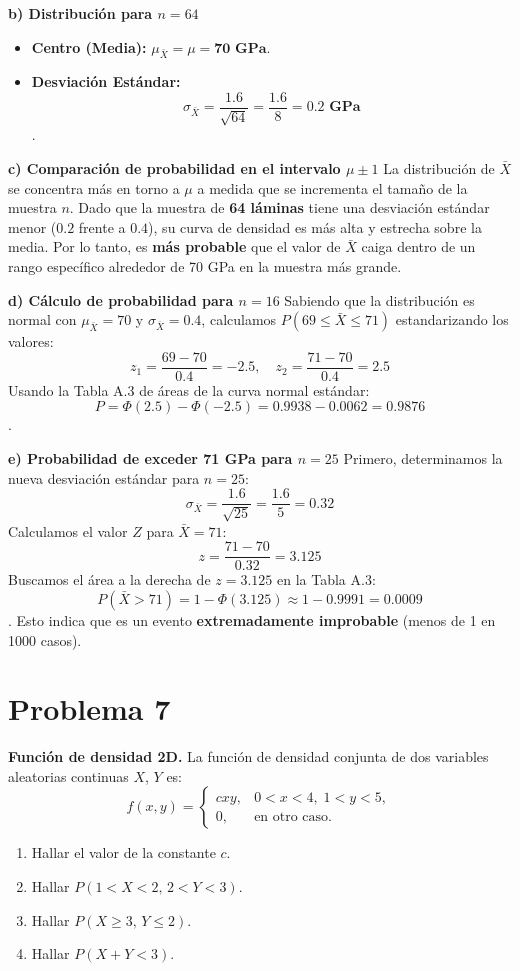 \documentclass[a4paper]{article}
\begin{document}
\textbf{b) Distribución para $n = 64$}
\begin{itemize}
    \item \textbf{Centro (Media):} $\mu_{\bar{X}} = \mu = \mathbf{70 \text{ GPa}}$.
    \item \textbf{Desviación Estándar:}
    $$\sigma_{\bar{X}} = \frac{1.6}{\sqrt{64}} = \frac{1.6}{8} = \mathbf{0.2 \text{ GPa}}$$.
\end{itemize}

\textbf{c) Comparación de probabilidad en el intervalo $\mu \pm 1$}
La distribución de $\bar{X}$ se concentra más en torno a $\mu$ a medida que se incrementa el tamaño de la muestra $n$. Dado que la muestra de \textbf{64 láminas} tiene una desviación estándar menor ($0.2$ frente a $0.4$), su curva de densidad es más alta y estrecha sobre la media. Por lo tanto, es \textbf{más probable} que el valor de $\bar{X}$ caiga dentro de un rango específico alrededor de 70 GPa en la muestra más grande.

\textbf{d) Cálculo de probabilidad para $n = 16$}
Sabiendo que la distribución es normal con $\mu_{\bar{X}} = 70$ y $\sigma_{\bar{X}} = 0.4$, calculamos $P(69 \le \bar{X} \le 71)$ estandarizando los valores:
$$z_1 = \frac{69 - 70}{0.4} = -2.5, \quad z_2 = \frac{71 - 70}{0.4} = 2.5$$
Usando la Tabla A.3 de áreas de la curva normal estándar:
$$P = \Phi(2.5) - \Phi(-2.5) = 0.9938 - 0.0062 = \mathbf{0.9876}$$.

\textbf{e) Probabilidad de exceder 71 GPa para $n = 25$}
Primero, determinamos la nueva desviación estándar para $n = 25$:
$$\sigma_{\bar{X}} = \frac{1.6}{\sqrt{25}} = \frac{1.6}{5} = 0.32$$
Calculamos el valor $Z$ para $\bar{X} = 71$:
$$z = \frac{71 - 70}{0.32} = 3.125$$
Buscamos el área a la derecha de $z = 3.125$ en la Tabla A.3:
$$P(\bar{X} > 71) = 1 - \Phi(3.125) \approx 1 - 0.9991 = \mathbf{0.0009}$$.
Esto indica que es un evento \textbf{extremadamente improbable} (menos de 1 en 1000 casos).

\section{Problema 7}
\textbf{Función de densidad 2D.} La función de densidad conjunta de dos variables aleatorias continuas $X$, $Y$ es:
\[
f(x,y)=
\begin{cases}
cxy, & 0<x<4,\;1<y<5,\\
0, & \text{en otro caso}.
\end{cases}
\]

\begin{enumerate}[label=\alph*)]
    \item Hallar el valor de la constante $c$.
    \item Hallar $P(1<X<2,\,2<Y<3)$.
    \item Hallar $P(X\ge 3,\,Y\le 2)$.
    \item Hallar $P(X+Y<3)$.
\end{enumerate}
\end{document}
